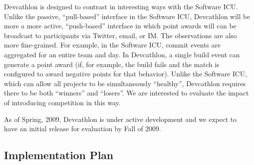 Devcathlon is designed to contrast in interesting ways with the Software
ICU.  Unlike the passive, ``pull-based'' interface in the Software ICU,
Devcathlon will be more a more active, ``push-based'' interface in which
point awards will can be broadcast to participants via Twitter, email, or
IM.  The observations are also more fine-grained. For example, in the
Software ICU, commit events are aggregated for an entire team and day.  In
Devcathlon, a single build event can generate a point award (if, for
example, the build fails and the match is configured to award negative
points for that behavior).  Unlike the Software ICU, which can allow all
projects to be simultaneously ``healthy'', Devcathlon requires there to be both ``winners''
and ``losers''.  We are interested to evaluate the impact of introducing
competition in this way. 

As of Spring, 2009, Devcathlon is under active development and we expect to
have an initial release for evaluation by Fall of 2009.


\subsection{Implementation Plan}
\label{sec:implementation}





